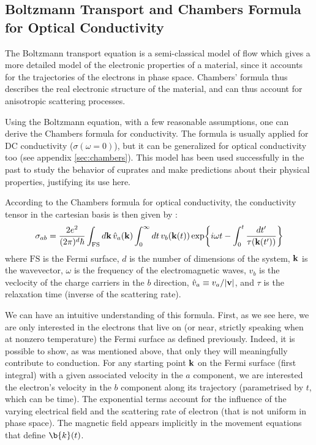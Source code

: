 \subsection{Boltzmann Transport and Chambers Formula for Optical Conductivity}
The Boltzmann transport equation is a semi-classical model of flow 
which gives a more detailed model of the electronic properties of a material, 
since it accounts for the trajectories of the electrons in phase space. 
Chambers' formula thus describes the real electronic structure of the material, 
and can thus account for anisotropic scattering processes.

Using the Boltzmann equation, with a few reasonable assumptions, 
one can derive the Chambers formula for conductivity. 
The formula is usually applied for DC conductivity ($\sigma(\omega=0)$), 
but it can be generalized for optical conductivity too (see appendix \ref{sec:chambers}).
This model has been used successfully in the past to study the behavior of cuprates 
and make predictions about their physical properties\cite{grissonnanche2021, grissonnanche2024, fang2022, gourgout2022, ataei2022}, 
justifying its use here.

According to the Chambers formula for optical conductivity, 
the conductivity tensor in the cartesian basis is then given by :
\begin{equation}
	\sigma_{ab} = \frac{2e^2}{(2\pi)^d\hbar}\int_{\mathrm{FS}}\dd{\vb{k}}\hat{v}_a(\vb{k})
        \int_0^{\infty}\dd{t}v_b(\vb{k}(t))\exp{i\omega t
        - \int_0^t \frac{\mathop{dt'}}{\tau(\vb{k}(t'))}}
\end{equation}
where $\mathrm{FS}$ is the Fermi surface, $d$ is the number of dimensions of the system, $\vb{k}$ is the
wavevector, $\omega$ is the frequency of the electromagnetic waves, $v_b$ is the veclocity of the
charge carriers in the $b$ direction, $\hat{v}_a\equiv v_a/\abs{\vb{v}}$, and $\tau$ is the
relaxation time (inverse of the scattering rate). 

We can have an intuitive understanding of this formula. 
First, as we see here, we are only interested in the electrons that live on (or near, strictly speaking when at nonzero temperature) the Fermi surface as defined previously. 
Indeed, it is possible to show, as was mentioned above, that only they will meaningfully contribute to conduction. 
For any starting point $\vb{k}$ on the Fermi surface (first integral) with a given associated velocity in the $a$ component, 
we are interested the electron's velocity in the $b$ component along its trajectory (parametrised by $t$,  which can be time). 
The exponential terms account for the influence of the varying electrical field and the scattering rate of electron (that is not uniform in phase space). 
The magnetic field appears implicitly in the movement equations that define $\b{k}(t)$.

